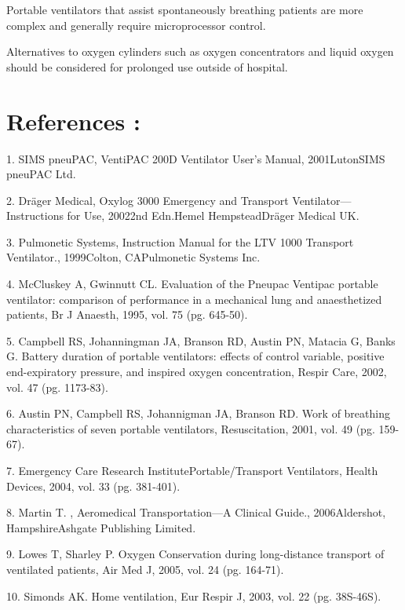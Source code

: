\documentclass[12pt]{article}
\begin{document}
Portable ventilators that assist spontaneously breathing patients are more complex and generally require microprocessor control.

Alternatives to oxygen cylinders such as oxygen concentrators and liquid oxygen should be considered for prolonged use outside of hospital.


\clearpage
\section*{References : }

1.   	SIMS pneuPAC, VentiPAC 200D Ventilator User’s Manual, 2001LutonSIMS pneuPAC Ltd.



2.   	Dräger Medical, Oxylog 3000 Emergency and Transport Ventilator—Instructions for Use, 20022nd Edn.Hemel HempsteadDräger Medical UK.


3.   	Pulmonetic Systems, Instruction Manual for the LTV 1000 Transport Ventilator., 1999Colton, CAPulmonetic Systems Inc.


4.   	McCluskey A,  Gwinnutt CL. Evaluation of the Pneupac Ventipac portable ventilator: comparison of performance in a mechanical lung and anaesthetized patients, Br J Anaesth, 1995, vol. 75 (pg. 645-50).


5.   	Campbell RS,  Johanningman JA,  Branson RD,  Austin PN,  Matacia G,  Banks G. Battery duration of portable ventilators: effects of control variable, positive end-expiratory pressure, and inspired oxygen concentration, Respir Care, 2002, vol. 47 (pg. 1173-83).


6.   	Austin PN,  Campbell RS,  Johannigman JA,  Branson RD. Work of breathing characteristics of seven portable ventilators, Resuscitation, 2001, vol. 49 (pg. 159-67).


7.   	Emergency Care Research InstitutePortable/Transport Ventilators, Health Devices, 2004, vol. 33 (pg. 381-401).


8.   	Martin T. , Aeromedical Transportation—A Clinical Guide., 2006Aldershot, HampshireAshgate Publishing Limited.


9.   	Lowes T,  Sharley P. Oxygen Conservation during long-distance transport of ventilated patients, Air Med J, 2005, vol. 24 (pg. 164-71).


10.  	Simonds AK. Home ventilation, Eur Respir J, 2003, vol. 22 (pg. 38S-46S).
\end{document}
